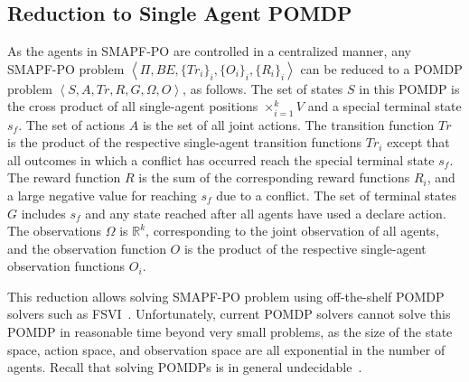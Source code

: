 \documentclass[letterpaper]{article} %
\newcommand{\tuple}[1]{\ensuremath{\left \langle #1 \right \rangle }}
\newcommand{\plan}[1]{{\textcolor{blue}{[Plan: #1]}}}
\newcommand{\inon}[1]{ }
\newcommand{\roni}[1]{ }
\begin{document}
\subsection{Reduction to Single Agent POMDP}
\label{sec:reduction}
As the agents in SMAPF-PO are controlled in a centralized manner, any SMAPF-PO problem $\tuple{\Pi,BE,\{Tr_i\}_i, \{O_i\}_i, \{R_i\}_i}$ can be reduced to a POMDP problem $\tuple{S,A,Tr,R,G,\Omega,O}$, as follows.
The set of states $S$ in this POMDP
is the cross product of all single-agent positions $\times_{i=1}^k V$ and a special terminal state $s_f$.
The set of actions $A$ is the set of all joint actions.
The transition function $Tr$ is the product of the respective single-agent transition functions $Tr_i$ except that all outcomes in which a conflict has occurred reach the special terminal state $s_f$.
The reward function $R$ is the sum of the corresponding reward functions $R_i$, and a large negative value for reaching $s_f$ due to a conflict.
The set of terminal states $G$ includes $s_f$ and any state reached after all agents have used a declare action.
The observations $\Omega$ is $\mathbb{R}^k$, corresponding to the joint observation of all agents, and the observation function $O$ is the product of the respective single-agent observation functions $O_i$.


This reduction allows solving SMAPF-PO problem using off-the-shelf POMDP solvers such as FSVI~\cite{shani2007forward}.
Unfortunately, current POMDP solvers cannot solve this POMDP in reasonable time beyond very small problems, as the size of the state space, action space, and observation space are all exponential in the number of agents. Recall that solving POMDPs is in general undecidable~\cite{madani2003undecidability}. %

\end{document}
